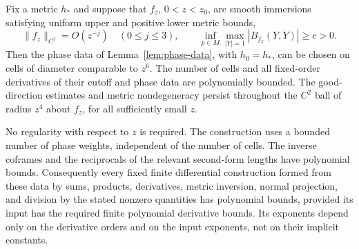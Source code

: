 \begin{lemma}\label{lem:polynomial-phase-data}
Fix a metric $h_*$ and suppose that $f_z$, $0<z<z_0$, are smooth
immersions satisfying uniform upper and positive lower metric bounds,
\[
 \|f_z\|_{C^j}=O(z^{-j})\quad(0\le j\le3),
 \qquad
 \inf_{p\in M}\max_{|Y|=1}|B_{f_z}(Y,Y)|\ge c>0.
\]
Then the phase data of Lemma~\ref{lem:phase-data}, with $h_0=h_*$, can be chosen
on cells of diameter comparable to $z^6$. The number of cells and all fixed-order
derivatives of their cutoff and phase data are polynomially bounded.
The good-direction estimates and metric nondegeneracy persist throughout the
$C^2$ ball of radius $z^4$ about $f_z$, for all sufficiently small $z$.

No regularity with respect to $z$ is required.
The construction uses a bounded number of phase weights, independent of the
number of cells. The inverse coframes and the reciprocals of the relevant
second-form lengths have polynomial bounds. Consequently every fixed finite
differential construction formed from these data by sums, products, derivatives,
metric inversion, normal projection, and division by the stated nonzero
quantities has polynomial bounds, provided its input has the required finite
polynomial derivative bounds. Its exponents depend only on the derivative
orders and on the input exponents, not on their implicit constants.
\end{lemma}

